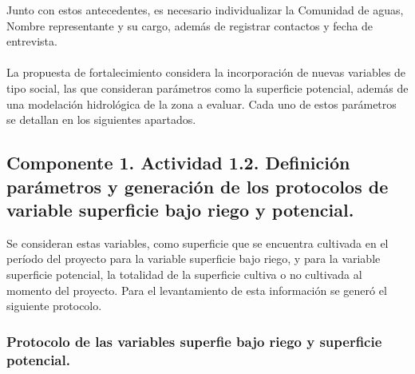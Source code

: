 \documentclass[]{article}
\begin{document}
Junto con estos antecedentes, es necesario individualizar la Comunidad de aguas, Nombre representante y su cargo, además de registrar contactos y fecha de entrevista.\\
\\
La propuesta de fortalecimiento considera la incorporación de nuevas variables de tipo social, las que consideran parámetros como la superficie potencial, además de una modelación hidrológica de la zona a evaluar. Cada uno de estos parámetros se detallan en los siguientes apartados.

\subsection{Componente 1. Actividad 1.2. Definición parámetros y generación de los protocolos de variable superficie bajo riego y potencial.}

Se consideran estas variables, como superficie que se encuentra cultivada en el período del proyecto para la variable superficie bajo riego, y para la variable superficie potencial, la totalidad de la superficie cultiva o no cultivada al momento del proyecto. Para el levantamiento de esta información se generó el siguiente protocolo.

\subsubsection{Protocolo de las variables superfie bajo riego y superficie potencial.}
\end{document}
